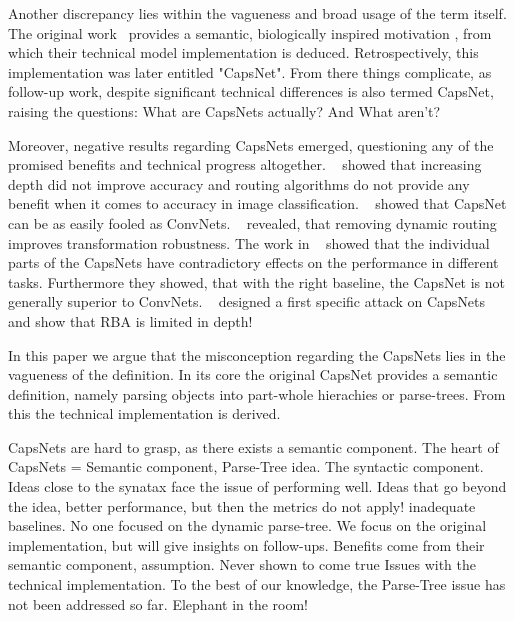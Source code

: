\documentclass{article}
\begin{document}
Another discrepancy lies within the vagueness and broad usage of the term itself.
The original work~\cite{nips/SabourFH17} provides a semantic, biologically inspired motivation , from which their technical model implementation is deduced. Retrospectively, this implementation was later entitled "CapsNet".
From there things complicate, as follow-up work, despite significant technical differences is also termed CapsNet, raising the questions: What are CapsNets actually? And What aren't?

Moreover, negative results regarding CapsNets emerged, questioning any of the promised benefits and technical progress altogether.
~\cite{acml/PaikKK19} showed that increasing depth did not improve accuracy and routing algorithms do not provide any benefit when it comes to accuracy in image classification.
~\cite{corr/michels2019} showed that CapsNet can be as easily fooled as ConvNets.
~\cite{ieee/Gu2020} revealed, that removing dynamic routing improves transformation robustness.
The work in ~\cite{cvpr/GuT021} showed that the individual parts of the CapsNets have contradictory effects on the performance in different tasks. Furthermore they showed, that with the right baseline, the CapsNet is not generally superior to ConvNets.
~\cite{iclr/Gu2021} designed a first specific attack on CapsNets and
\cite{prl/PeerSR21} show that RBA is limited in depth!

In this paper we argue that the misconception regarding the CapsNets lies in the vagueness of the definition.
In its core the original CapsNet provides a semantic definition, namely parsing objects into part-whole hierachies or parse-trees.
From this the technical implementation is derived.


CapsNets are hard to grasp, as there exists a semantic component.
The heart of CapsNets = Semantic component, Parse-Tree idea.
The syntactic component.
Ideas close to the synatax face the issue of performing well.
Ideas that go beyond the idea, better performance, but then the metrics do not apply! inadequate baselines.
No one focused on the dynamic parse-tree.
We focus on the original implementation, but will give insights on follow-ups.
Benefits come from their semantic component, assumption. Never shown to come true
Issues with the technical implementation.
To the best of our knowledge, the Parse-Tree issue has not been addressed so far. Elephant in the room!
\end{document}
